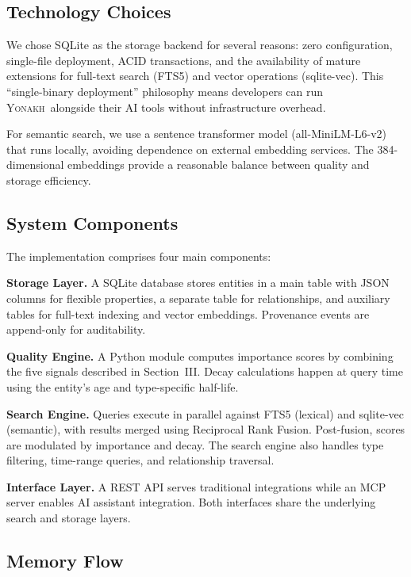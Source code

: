 \documentclass[10pt,journal,compsoc]{IEEEtran}
\newcommand{\yonakh}{\textsc{Yonakh}}
\begin{document}
\subsection{Technology Choices}

We chose SQLite as the storage backend for several reasons: zero configuration, single-file deployment, ACID transactions, and the availability of mature extensions for full-text search (FTS5) and vector operations (sqlite-vec). This ``single-binary deployment'' philosophy means developers can run \yonakh\ alongside their AI tools without infrastructure overhead.

For semantic search, we use a sentence transformer model (all-MiniLM-L6-v2) \cite{reimers2019sentence} that runs locally, avoiding dependence on external embedding services. The 384-dimensional embeddings provide a reasonable balance between quality and storage efficiency.

\subsection{System Components}

The implementation comprises four main components:

\textbf{Storage Layer.} A SQLite database stores entities in a main table with JSON columns for flexible properties, a separate table for relationships, and auxiliary tables for full-text indexing and vector embeddings. Provenance events are append-only for auditability.

\textbf{Quality Engine.} A Python module computes importance scores by combining the five signals described in Section~III. Decay calculations happen at query time using the entity's age and type-specific half-life.

\textbf{Search Engine.} Queries execute in parallel against FTS5 (lexical) and sqlite-vec (semantic), with results merged using Reciprocal Rank Fusion. Post-fusion, scores are modulated by importance and decay. The search engine also handles type filtering, time-range queries, and relationship traversal.

\textbf{Interface Layer.} A REST API serves traditional integrations while an MCP server enables AI assistant integration. Both interfaces share the underlying search and storage layers.

\subsection{Memory Flow}
\end{document}
